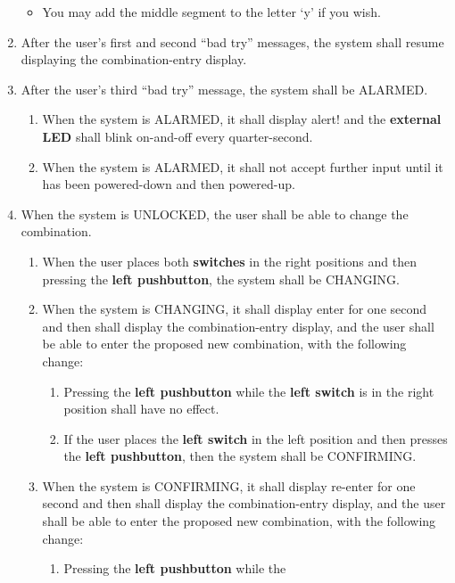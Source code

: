 \begin{enumerate}
\begin{itemize}
    \item You may add the middle segment to the letter `y' if you wish.
    \end{itemize}
\item After the user's first and second ``bad try'' messages, the system shall
    resume displaying the combination-entry display.
\item After the user's third ``bad try'' message, the system shall be ALARMED.
    \begin{enumerate}
    \item When the system is ALARMED, it shall display {\dviiseg alert!} and
        the \textbf{external LED} shall blink on-and-off every quarter-second.
    \item When the system is ALARMED, it shall not accept further input until
        it has been powered-down and then powered-up.
    \end{enumerate}
\item \label{spec:changeCombination} When the system is UNLOCKED, the user shall
    be able to change the combination.
    \begin{enumerate}
    \item When the user places both \textbf{switches} in the right positions and
        then pressing the \textbf{left pushbutton}, the system shall be
        CHANGING.
    \item When the system is CHANGING, it shall display {\dviiseg enter} for
        one second and then shall display the combination-entry display, and
        the user shall be able to enter the proposed new combination, with the
        following change:
        \begin{enumerate}
        \item Pressing the \textbf{left pushbutton} while the
            \textbf{left switch} is in the right position shall have no effect.
        \item If the user places the \textbf{left switch} in the left position
            and then presses the \textbf{left pushbutton}, then the system
            shall be CONFIRMING.
        \end{enumerate}
    \item When the system is CONFIRMING, it shall display {\dviiseg re-enter}
        for one second and then shall display the combination-entry display, and
        the user shall be able to enter the proposed new combination, with the
        following change:
        \begin{enumerate}
        \item Pressing the \textbf{left pushbutton} while the

\end{enumerate}
\end{enumerate}
\end{enumerate}
